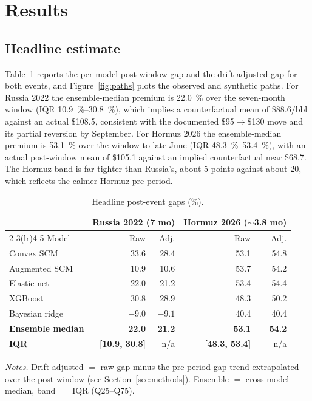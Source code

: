 \section{Results}\label{sec:results}
\subsection{Headline estimate}
Table~\ref{tab:headline} reports the per-model post-window gap and the drift-adjusted gap
for both events, and Figure~\ref{fig:paths} plots the observed and synthetic paths. For
Russia 2022 the ensemble-median premium is \SI{22.0}{\percent} over the
seven-month window (IQR \SIrange{10.9}{30.8}{\percent}), which implies a counterfactual
mean of \$88.6/bbl against an actual \$108.5, consistent with the documented
\$95$\to$\$130 move and its partial reversion by September. For Hormuz 2026 the
ensemble-median premium is \SI{53.1}{\percent} over the window to late June (IQR
\SIrange{48.3}{53.4}{\percent}), with an actual post-window mean of \$105.1 against an
implied counterfactual near \$68.7. The Hormuz band is far tighter than Russia's, about
5 points against about 20, which reflects the calmer Hormuz pre-period.

\begin{table}[h]
\centering
\caption{Headline post-event gaps (\%).}
\label{tab:headline}
\begin{threeparttable}
\small
\begin{tabular}{@{}lrr@{\hskip 1.6em}rr@{}}
\toprule
& \multicolumn{2}{c}{Russia 2022 (7 mo)} & \multicolumn{2}{c}{Hormuz 2026 ($\sim$3.8 mo)}\\
\cmidrule(lr){2-3}\cmidrule(lr){4-5}
Model & Raw & Adj. & Raw & Adj. \\
\midrule
Convex SCM     & 33.6 & 28.4 & 53.1 & 54.8 \\
Augmented SCM  & 10.9 & 10.6 & 53.7 & 54.2 \\
Elastic net    & 22.0 & 21.2 & 53.4 & 54.4 \\
XGBoost        & 30.8 & 28.9 & 48.3 & 50.2 \\
Bayesian ridge & $-9.0$ & $-9.1$ & 40.4 & 40.4 \\
\midrule
\textbf{Ensemble median} & \textbf{22.0} & \textbf{21.2} & \textbf{53.1} & \textbf{54.2} \\
\textbf{IQR} & \textbf{[10.9, 30.8]} & n/a & \textbf{[48.3, 53.4]} & n/a \\
\bottomrule
\end{tabular}
\begin{tablenotes}[flushleft]
\footnotesize
\item \textit{Notes.} Drift-adjusted $=$ raw gap minus the pre-period gap trend
extrapolated over the post-window (see Section~\ref{sec:methods}). Ensemble $=$
cross-model median, band $=$ IQR (Q25--Q75).
\end{tablenotes}
\end{threeparttable}
\end{table}

